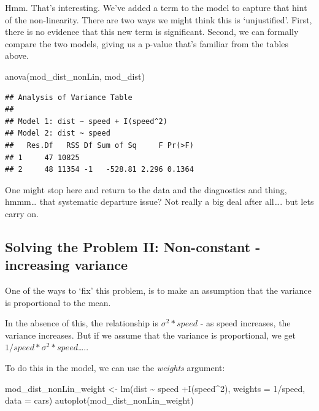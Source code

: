 \documentclass[
]{book}
\newenvironment{Shaded}{\begin{snugshade}}{\end{snugshade}}
\newcommand{\AttributeTok}[1]{\textcolor[rgb]{0.77,0.63,0.00}{#1}}
\newcommand{\DecValTok}[1]{\textcolor[rgb]{0.00,0.00,0.81}{#1}}
\newcommand{\FunctionTok}[1]{\textcolor[rgb]{0.00,0.00,0.00}{#1}}
\newcommand{\NormalTok}[1]{#1}
\newcommand{\OtherTok}[1]{\textcolor[rgb]{0.56,0.35,0.01}{#1}}
\newcommand{\SpecialCharTok}[1]{\textcolor[rgb]{0.00,0.00,0.00}{#1}}
\begin{document}
Hmm. That's interesting. We've added a term to the model to capture that hint of the non-linearity. There are two ways we might think this is `unjustified'. First, there is no evidence that this new term is significant. Second, we can formally compare the two models, giving us a p-value that's familiar from the tables above.

\begin{Shaded}
\begin{Highlighting}[]
\FunctionTok{anova}\NormalTok{(mod\_dist\_nonLin, mod\_dist)}
\end{Highlighting}
\end{Shaded}

\begin{verbatim}
## Analysis of Variance Table
## 
## Model 1: dist ~ speed + I(speed^2)
## Model 2: dist ~ speed
##   Res.Df   RSS Df Sum of Sq     F Pr(>F)
## 1     47 10825                          
## 2     48 11354 -1   -528.81 2.296 0.1364
\end{verbatim}

One might stop here and return to the data and the diagnostics and thing, hmmm\ldots{} that systematic departure issue? Not really a big deal after all\ldots. but lets carry on.

\hypertarget{solving-the-problem-ii-non-constant---increasing-variance}{%
\subsection{Solving the Problem II: Non-constant - increasing variance}\label{solving-the-problem-ii-non-constant---increasing-variance}}

One of the ways to `fix' this problem, is to make an assumption that the variance is proportional to the mean.

In the absence of this, the relationship is \(\sigma^{2} * speed\) - as speed increases, the variance increases. But if we assume that the variance is proportional, we get \(1/speed * \sigma^{2} * speed\)\ldots..

To do this in the model, we can use the \emph{weights} argument:

\begin{Shaded}
\begin{Highlighting}[]
\NormalTok{mod\_dist\_nonLin\_weight }\OtherTok{\textless{}{-}} \FunctionTok{lm}\NormalTok{(dist }\SpecialCharTok{\textasciitilde{}}\NormalTok{ speed }\SpecialCharTok{+}\FunctionTok{I}\NormalTok{(speed}\SpecialCharTok{\^{}}\DecValTok{2}\NormalTok{), }\AttributeTok{weights =} \DecValTok{1}\SpecialCharTok{/}\NormalTok{speed, }\AttributeTok{data =}\NormalTok{ cars)}
\FunctionTok{autoplot}\NormalTok{(mod\_dist\_nonLin\_weight)}
\end{Highlighting}
\end{Shaded}
\end{document}
